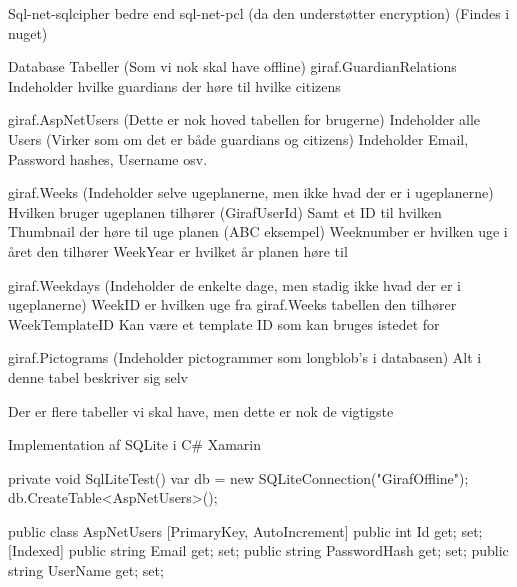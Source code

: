 Sql-net-sqlcipher bedre end sql-net-pcl (da den understøtter encryption) (Findes i nuget)

Database Tabeller (Som vi nok skal have offline)
    giraf.GuardianRelations
        Indeholder hvilke guardians der høre til hvilke citizens

    giraf.AspNetUsers (Dette er nok hoved tabellen for brugerne)
        Indeholder alle Users (Virker som om det er både guardians og citizens)
        Indeholder Email, Password hashes, Username osv.
        
    giraf.Weeks (Indeholder selve ugeplanerne, men ikke hvad der er i ugeplanerne)
        Hvilken bruger ugeplanen tilhører (GirafUserId)
        Samt et ID til hvilken Thumbnail der høre til uge planen (ABC eksempel)
        Weeknumber er hvilken uge i året den tilhører
        WeekYear er hvilket år planen høre til
        
    giraf.Weekdays (Indeholder de enkelte dage, men stadig ikke hvad der er i ugeplanerne)
        WeekID er hvilken uge fra giraf.Weeks tabellen den tilhører
        WeekTemplateID Kan være et template ID som kan bruges istedet for
        
    giraf.Pictograms (Indeholder pictogrammer som longblob's i databasen)
        Alt i denne tabel beskriver sig selv
        


Der er flere tabeller vi skal have, men dette er nok de vigtigste



Implementation af SQLite i C# Xamarin

private void SqlLiteTest()
{
    var db = new SQLiteConnection("GirafOffline");
    db.CreateTable<AspNetUsers>();
}

public class AspNetUsers
{
    [PrimaryKey, AutoIncrement]
    public int Id { get; set; }
    [Indexed]
    public string Email { get; set; }
    public string PasswordHash { get; set; }
    public string UserName { get; set; }
}